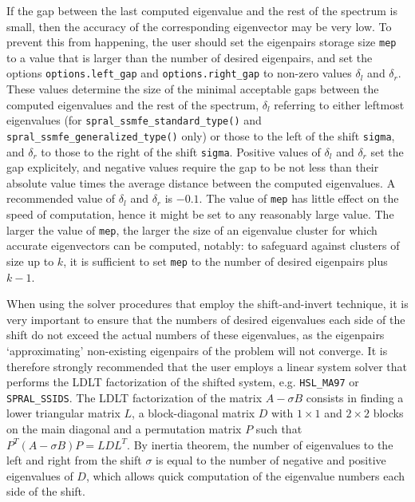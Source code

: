 If the gap %
between the last computed eigenvalue 
and the rest of the spectrum is small,
then the accuracy of the corresponding eigenvector may be very low.
To prevent this from happening,
the user should set the eigenpairs storage size {\tt mep}
to a value that is larger than the number of desired eigenpairs,
and set the options 
{\tt options.left\_gap}
and
{\tt options.right\_gap}
to non-zero values $\delta_l$ and $\delta_r$.
These values
determine the size of the minimal acceptable gaps
between the computed eigenvalues and the rest of the spectrum,
$\delta_l$ referring to either leftmost eigenvalues
(for {\tt spral\_ssmfe\_standard\_\texttt{type}()} and
{\tt spral\_ssmfe\_generalized\_\texttt{type}()} only)
or those to the left of the shift {\tt sigma},
and $\delta_r$
to those to the right of the shift {\tt sigma}.
Positive values of $\delta_l$ and $\delta_r$
set the gap explicitely,
and negative values
require the gap to be not less than their absolute value times
the average distance between the computed eigenvalues.
A recommended value of $\delta_l$ and $\delta_r$ is $-0.1$.
The value of {\tt mep} %
has little effect on
the speed of computation,
hence it might be set to any reasonably large value.
The larger the value of {\tt mep}, 
the larger the size of an eigenvalue cluster
for which accurate eigenvectors can be computed, notably:
to safeguard against clusters of size up to $k$,
it is sufficient to set {\tt mep} to the number of desired eigenpairs
plus $k - 1$.

When using the solver procedures that employ the shift-and-invert technique,
it is very important to ensure that the numbers of desired eigenvalues
each side of the shift do not exceed the actual numbers of these eigenvalues,
as the eigenpairs `approximating' non-existing eigenpairs of the problem
will not converge.
It is therefore strongly recommended that the user employs 
a linear system solver that performs
the LDLT
factorization of %
the shifted system,
e.g. {\tt HSL\_MA97} or {\tt SPRAL\_SSIDS}.
The LDLT factorization of the matrix
$A - \sigma B$ consists in finding a lower triangular
matrix $L$, a block-diagonal matrix $D$
with $1\times 1$ and $2\times 2$ blocks on the main diagonal
and a permutation matrix $P$
such that $P^T(A - \sigma B)P = L D L^T$.
By inertia theorem,
the number of eigenvalues to the left and right from 
the shift $\sigma$
is equal to the number of negative and positive eigenvalues of $D$,
which allows quick computation of the eigenvalue numbers
each side of the shift. %

